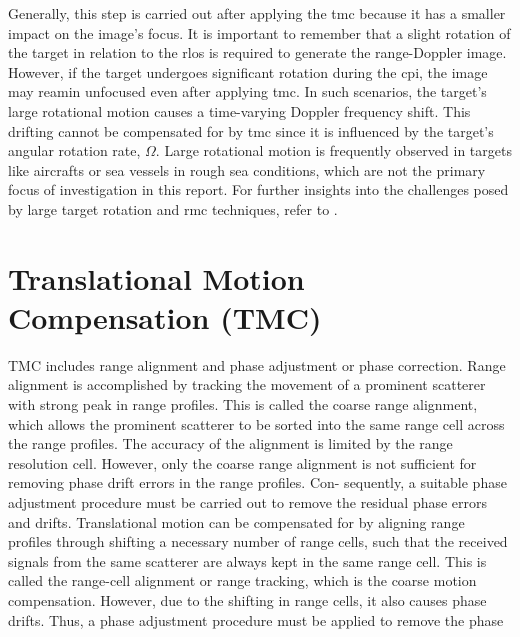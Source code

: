 \documentclass[class=report,11pt,crop=false]{standalone}
\begin{document}
    Generally, this step is carried out after applying the \gls{tmc} because it has a smaller impact on the image's focus. It is important to remember that a slight rotation of the target in relation to the \gls{rlos} is required to generate the range-Doppler image. However, if the target undergoes significant rotation during the \gls{cpi}, the image may reamin unfocused even after applying \gls{tmc}. In such scenarios, the target's large rotational motion causes a time-varying Doppler frequency shift. This drifting cannot be compensated for by \gls{tmc} since it is influenced by the target's angular rotation rate, $\Omega$. Large rotational motion is frequently observed in targets like aircrafts or sea vessels in rough sea conditions, which are not the primary focus of investigation in this report. For further insights into the challenges posed by large target rotation and \gls{rmc} techniques, refer to \cite{ISARtextbook_Martorella,ISARtextbook_Matlab}.

\section{Translational Motion Compensation (TMC)}

TMC includes range alignment and phase adjustment or phase correction. Range alignment is accomplished by tracking the movement of a prominent scatterer with strong peak in range profiles. This is called the coarse range alignment, which allows the prominent scatterer to be sorted into the same range cell across the range profiles. The accuracy of the alignment is limited by the range resolution cell. However, only the coarse range alignment is not sufficient for removing phase drift errors in the range profiles. Con- sequently, a suitable phase adjustment procedure must be carried out to remove the residual phase errors and drifts.
Translational motion can be compensated for by aligning range profiles through shifting a necessary number of range cells, such that the received signals from the same scatterer are always kept in the same range cell. This is called the range-cell alignment or range tracking, which is the coarse motion compensation. However, due to the shifting in range cells, it also causes phase drifts. Thus, a phase adjustment procedure must be applied to remove the phase
\end{document}
